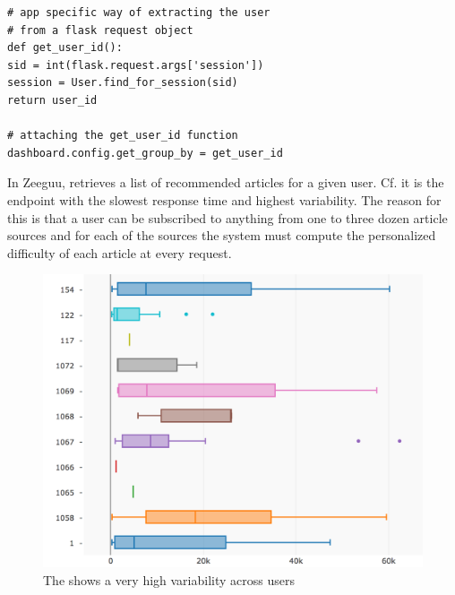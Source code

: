 \documentclass{sig-alternate-05-2015}
\begin{document}
\begin{lstlisting}[style=custompython]  
# app specific way of extracting the user
# from a flask request object    
def get_user_id():
sid = int(flask.request.args['session'])
session = User.find_for_session(sid)
return user_id

# attaching the get_user_id function
dashboard.config.get_group_by = get_user_id

\end{lstlisting}



In Zeeguu, \epFeedItems retrieves a list of recommended articles for a given user. Cf.  it is the endpoint with the slowest response time and highest variability. The reason for this is that a user can be subscribed to anything from one to three dozen article sources and for each of the sources the system must compute the personalized difficulty of each article at every request. 



\begin{figure}[!ht]
	\centering
	\includegraphics[width=0.85\linewidth]{time_per_user}
	\caption{The \epFeedItems shows a very high variability across users}
	\label{fig:tpu}
\end{figure}
\end{document}

